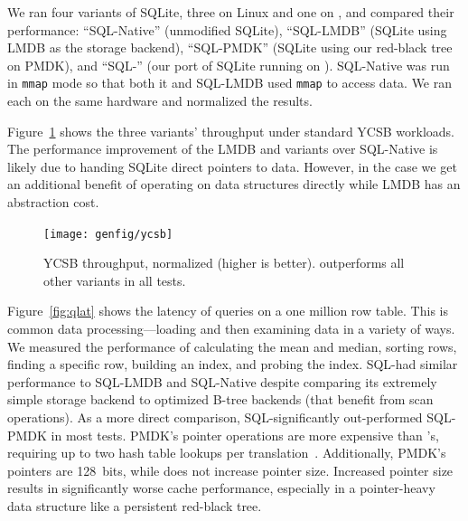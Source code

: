 We ran four variants of SQLite, three on Linux and one on \Twizzler, and compared their performance: ``SQL-Native'' (unmodified SQLite),
``SQL-LMDB'' (SQLite using LMDB as the storage backend), ``SQL-PMDK'' (SQLite using
our red-black tree on PMDK),
and ``SQL-\Twizzler'' (our port of SQLite running on \Twizzler). SQL-Native was run in \texttt{mmap} mode so that both it
and SQL-LMDB used \texttt{mmap} to access data.
We ran each on the same hardware and normalized the results.


Figure~\ref{fig:ycsb} shows the three variants' throughput under standard YCSB
workloads. The performance improvement of the LMDB and \Twizzler variants over SQL-Native is
likely due to handing SQLite direct pointers to data. However, in the \Twizzler
case we get an additional benefit of operating on data structures directly while LMDB has an
abstraction cost.

\begin{figure}
    \centering
    \texttt{[image: genfig/ycsb]}
    \caption{YCSB throughput, normalized (higher is better). \Twizzler outperforms all other
        variants in all tests.}
    \label{fig:ycsb}
\end{figure}

Figure~\ref{fig:qlat} shows the latency of queries on a one million row table.
This is common data processing---loading and then
examining data in a variety of ways.
We measured the performance
of calculating the mean and median, sorting rows, finding a specific row,
building an index, and probing the index. SQL-\Twizzler had similar performance to SQL-LMDB and
SQL-Native despite comparing its extremely simple storage backend to optimized B-tree
backends (that benefit from scan operations). As a more direct comparison,
SQL-\Twizzler significantly out-performed SQL-PMDK in most tests. PMDK's pointer operations are
more expensive than \Twizzler's, requiring up to two hash table lookups per
translation~\cite{pmdk-pointers}. Additionally, PMDK's
pointers are 128~bits, while \Twizzler does not increase pointer size. Increased
pointer size results in significantly worse cache performance, especially in a pointer-heavy data
structure like a persistent red-black tree.



